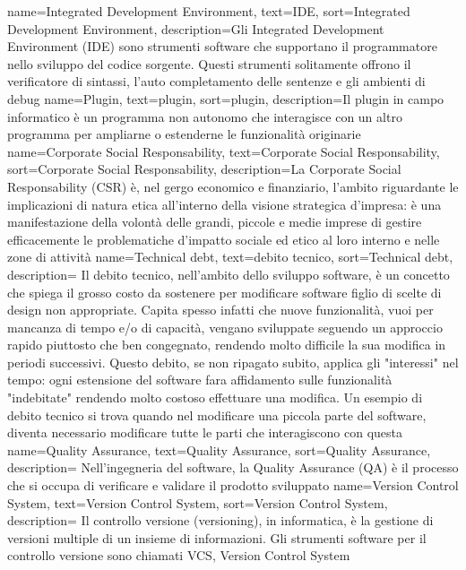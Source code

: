 {
	name=Integrated Development Environment,
	text=IDE,
	sort=Integrated Development Environment,
	description={Gli Integrated Development Environment (IDE) sono strumenti software che supportano il programmatore nello sviluppo del codice sorgente. Questi strumenti solitamente offrono il verificatore di sintassi, l'auto completamento delle sentenze e gli ambienti di debug}
}
{
	name=Plugin,
	text=plugin,
	sort=plugin,
	description={Il plugin in campo informatico è un programma non autonomo che interagisce con un altro programma per ampliarne o estenderne le funzionalità originarie}
}
{
	name=Corporate Social Responsability,
	text=Corporate Social Responsability,
	sort=Corporate Social Responsability,
	description={La Corporate Social Responsability (CSR) è, nel gergo economico e finanziario, l'ambito riguardante le implicazioni di natura etica all'interno della visione strategica d'impresa: è una manifestazione della volontà delle grandi, piccole e medie imprese di gestire efficacemente le problematiche d'impatto sociale ed etico al loro interno e nelle zone di attività}
}
{
	name=Technical debt,
	text=debito tecnico,
	sort=Technical debt,
	description={ Il debito tecnico, nell'ambito dello sviluppo software, è un concetto che spiega il grosso costo da sostenere per modificare software figlio di scelte di design non appropriate. Capita spesso infatti che nuove funzionalità, vuoi per mancanza di tempo e/o di capacità, vengano sviluppate seguendo un approccio rapido piuttosto che ben congegnato, rendendo molto difficile la sua modifica in periodi successivi. Questo debito, se non ripagato subito, applica gli "interessi" nel tempo: ogni estensione del software fara affidamento sulle funzionalità "indebitate" rendendo molto costoso effettuare una modifica. Un esempio di debito tecnico si trova quando nel modificare una piccola parte del software, diventa necessario modificare tutte le parti che interagiscono con questa}
}
{
	name=Quality Assurance,
	text=Quality Assurance,
	sort=Quality Assurance,
	description={ Nell'ingegneria del software, la Quality Assurance (QA) è il processo che si occupa di verificare e validare il prodotto sviluppato}
}
{
	name=Version Control System,
	text=Version Control System,
	sort=Version Control System,
	description={ Il controllo versione (versioning), in informatica, è la gestione di versioni multiple di un insieme di informazioni. Gli strumenti software per il controllo versione sono chiamati VCS, Version Control System}
}
